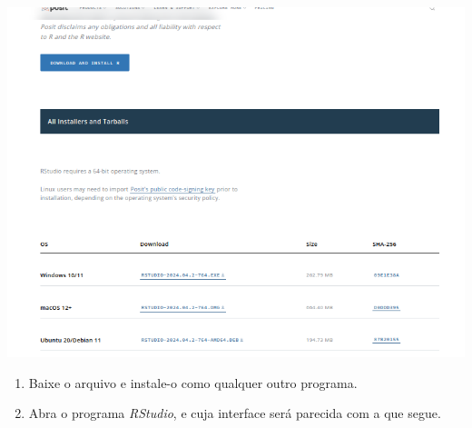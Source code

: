 \documentclass[
  letterpaper,
  DIV=11,
  numbers=noendperiod]{scrreprt}
\begin{document}
\includegraphics{rstudioInstala.png}

\begin{enumerate}
\def\labelenumi{\arabic{enumi}.}
\setcounter{enumi}{2}
\item
  Baixe o arquivo e instale-o como qualquer outro programa.
\item
  Abra o programa \emph{RStudio}, e cuja interface será parecida com a
  que segue.
\end{enumerate}

\begin{figure}


\caption{\label{fig-rstudioJanela}}

\end{figure}%
\end{document}

